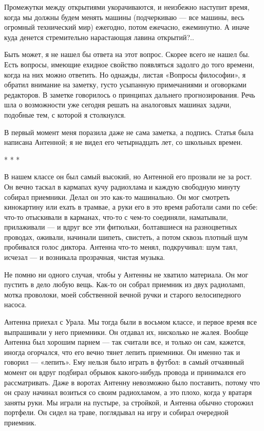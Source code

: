    Промежутки между  открытиями укорачиваются,  и неизбежно  наступит  время,
   когда мы  должны  будем менять  машины  (подчеркиваю —  все  машины,  весь
   огромный технический мир)  ежегодно, потом ежечасно,  ежеминутно. А  иначе
   куда денется стремительно нарастающая лавина открытий?..

   Быть может, я не нашел бы ответа на этот вопрос. Скорее всего не нашел бы.
   Есть вопросы, имеющие ехидное свойство появляться задолго до того времени,
   когда на них  можно ответить.  Но однажды, листая  «Вопросы философии»,  я
   обратил внимание  на заметку,  густо усыпанную  примечаниями и  оговорками
   редакторов. В  заметке говорилось  о принципах  дальнего  прогнозирования.
   Речь шла о возможности  уже сегодня решать  на аналоговых машинах  задачи,
   подобные тем, с которой я столкнулся.

   В первый момент меня поразила даже не сама заметка, а подпись. Статья была
   написана Антенной; я не видел его четырнадцать лет, со школьных времен.

                                     * * *

   В нашем классе он был самый высокий, но Антенной его прозвали не за  рост.
   Он вечно  таскал в  кармапах  кучу радиохлама  и каждую  свободную  минуту
   собирал приемники.  Делал  он  это  как-то  машинально.  Он  мог  смотреть
   кинокартину или ехать в трамвае, а руки  его в это время работали сами  по
   себе: что-то отыскивали в карманах, что-то с чем-то соединяли, наматывали,
   прилаживали —  и  вдруг  все эти  фитюльки,  болтавшиеся  на  разноцветных
   проводах, оживали, начинали шипеть, свистеть,  а потом сквозь плотный  шум
   пробивался голос  диктора. Антенна  что-то менял,  подкручивал: шум  таял,
   исчезал — и возникала прозрачная, чистая музыка.

   Не помню ни одного  случая, чтобы у Антенны  не хватило материала. Он  мог
   пустить в дело любую  вещь. Как-то он собрал  приемник из двух  радиоламп,
   мотка проволоки,  моей собственной  вечной ручки  и старого  велосипедного
   насоса.

   Антенна приехал с Урала.  Мы тогда были в  восьмом классе, и первое  время
   все выпрашивали  у него  приемники.  Он отдавал  их, нисколько  не  жалея.
   Вообще Антенна был  хорошим парнем  — так считали  все, и  только он  сам,
   кажется, иногда огорчался, что его вечно тянет лепить приемники. Он именно
   так и  говорил  — «лепить».  Ему  нельзя было  играть  в футбол:  в  самый
   отчаянный  момент  он  вдруг  подбирал  обрывок  какого-нибудь  провода  и
   принимался его  рассматривать.  Даже  в воротах  Антенну  невозможно  было
   поставить, потому что он  сразу начинал возиться  со своим радиохламом,  а
   это плохо, когда у вратаря заняты руки. Мы играли на пустыре, за стройкой,
   и Антенна обычно сторожил портфели. Он сидел на траве, поглядывал на  игру
   и собирал очередной приемник.

